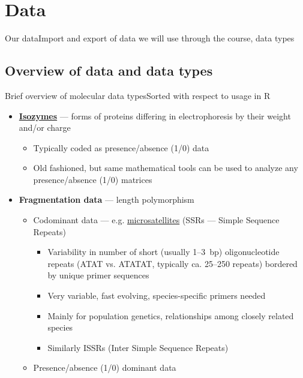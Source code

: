 \documentclass[compress, ucs, xelatex, 11pt, xcolor=svgnames, aspectratio=169,
	hyperref={
		bookmarks=true,
		unicode=true,
		colorlinks=true,
		pdftitle={Molecular data in R},
		plainpages=false,
		pdfauthor={Vojtech Zeisek},
		pdfsubject={Course about phylogeny and evolution in R},
		pdfcreator={XeLaTeX},
		pdfkeywords={R, evolution, phylogeny, molecular data},
		linkcolor=Crimson, %
		anchorcolor=Magenta, %
		citecolor=Magenta, %
		filecolor=Magenta, %
		menucolor=Magenta, %
		urlcolor=DodgerBlue, %
		pdftex},
	url={hyphens, lowtilde} %
	]{beamer}
\begin{document}
\section{Data}

\begin{frame}{Our data}{Import and export of data we will use through the course, data types}
	\tableofcontents[currentsection, sectionstyle=show/hide, hideothersubsections]
\end{frame}

\subsection[Overview]{Overview of data and data types}

\begin{frame}[allowframebreaks]{Brief overview of molecular data types}{Sorted with respect to usage in R}
	\begin{itemize}
		\item \textbf{\href{https://en.wikipedia.org/wiki/Isozyme}{Isozymes}} --- forms of proteins differing in electrophoresis by their weight and/or charge
		\begin{itemize}
			\item Typically coded as presence/absence (1/0) data
			\item Old fashioned, but same mathematical tools can be used to analyze any presence/absence (1/0) matrices
		\end{itemize}
		\item \textbf{Fragmentation data} --- length polymorphism
		\begin{itemize}
			\item Codominant data --- e.g. \href{https://en.wikipedia.org/wiki/Microsatellite}{microsatellites} (SSRs --- Simple Sequence Repeats)
			\begin{itemize}
				\item Variability in number of short (usually 1--3~bp) oligonucleotide repeats (ATAT vs. ATATAT, typically ca. 25--250 repeats) bordered by unique primer sequences
				\item Very variable, fast evolving, species-specific primers needed
				\item Mainly for population genetics, relationships among closely related species
				\item Similarly ISSRs (Inter Simple Sequence Repeats)
			\end{itemize}
			\item Presence/absence (1/0) dominant data

\end{itemize}
\end{itemize}
\end{frame}
\end{document}
